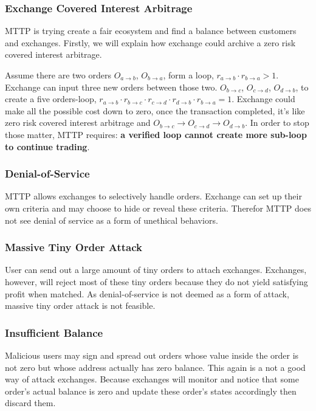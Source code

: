 \documentclass[UTF8,nofonts]{article}
\begin{document}
\subsubsection{Exchange Covered Interest Arbitrage}

MTTP is trying create a fair ecosystem and find a balance between customers and exchanges. Firstly,  we will explain how exchange could archive a zero risk covered interest arbitrage.

Assume there are two orders $O_{a\rightarrow b}$, $O_{b\rightarrow a}$, form a loop, $r_{a\rightarrow b} \cdot r_{b\rightarrow a} > 1$. Exchange can input three new orders between those two. $O_{b\rightarrow c}$, $O_{c\rightarrow d}$, $O_{d\rightarrow b}$, to create a five orders-loop,  $r_{a\rightarrow b} \cdot r_{b\rightarrow c} \cdot r_{c\rightarrow d}\cdot r_{d\rightarrow b}\cdot r_{b\rightarrow a} = 1$. Exchange could make all the possible cost down to zero, once the transaction completed, it's like zero risk covered interest arbitrage
and $O_{b\rightarrow c}\rightarrow O_{c\rightarrow d}\rightarrow O_{d\rightarrow b}$. In order to stop those matter, MTTP requires: {\bfseries a verified loop cannot create more sub-loop to continue trading}.

\subsubsection{Denial-of-Service}

MTTP allows exchanges to selectively handle orders. Exchange can set up their own criteria and may choose to hide or reveal these criteria. Therefor MTTP does not see denial of service as a form of unethical behaviors.

\subsubsection{Massive Tiny Order Attack}
User can send out a large amount of tiny orders to attach exchanges. Exchanges, however, will reject most of these tiny orders because they do not yield satisfying profit when matched. As denial-of-service is not deemed as a form of attack, massive tiny order attack is not feasible.

\subsubsection{Insufficient Balance}

Malicious users may sign and spread out orders whose value inside the order is not zero but whose address actually has zero balance. This again is a not a good way of attack exchanges. Because exchanges will monitor and notice that some order's actual balance is zero and update these order's states accordingly then discard them.  
\end{document}
